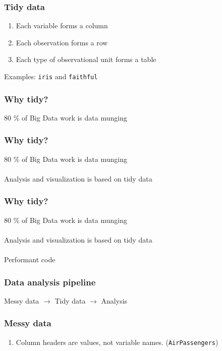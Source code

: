 \documentclass{beamer}
\begin{document}
\begin{frame}
	\frametitle{Tidy data}
	\begin{center}
		\begin{enumerate}
			\item Each variable forms a column
			\item Each observation forms a row
			\item Each type of observational unit forms a table
		\end{enumerate}
		\medskip
		Examples: \texttt{iris} and \texttt{faithful}
	\end{center}
\end{frame}

\begin{frame}
	\frametitle{Why tidy?}
	\begin{center}
		80 \% of Big Data work is data munging\\
	\end{center}
\end{frame}

\begin{frame}
	\frametitle{Why tidy?}
	\begin{center}
		80 \% of Big Data work is data munging\\~\\
		Analysis and visualization is based on tidy data
	\end{center}
\end{frame}

\begin{frame}
	\frametitle{Why tidy?}
	\begin{center}
		80 \% of Big Data work is data munging\\~\\
		Analysis and visualization is based on tidy data\\~\\
		Performant code
	\end{center}
\end{frame}

\begin{frame}
	\frametitle{Data analysis pipeline}
	\begin{center}
		Messy data $\rightarrow$ Tidy data $\rightarrow$ Analysis
	\end{center}
\end{frame}

\begin{frame}
	\frametitle{Messy data}
	\begin{center}
		\begin{enumerate}
			\item Column headers are values, not variable names. 
			(\texttt{AirPassengers})
		\end{enumerate}
	\end{center}
\end{frame}
\end{document}
